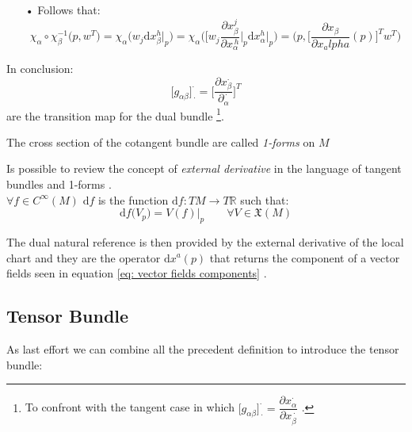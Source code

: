 \documentclass[a4paper,12pt]{scrartcl}    %
\begin{document}
\begin{observation}
\begin{itemize}
\item[•] Follows that:
	\begin{displaymath}
		\chi_\alpha \circ \chi_\beta^{-1} \big( p, w^T \big) =
		\chi_\alpha \big( w_j \textrm{d}x^h_\beta \big \vert_p \big) =
		\chi_\alpha \big( \big[ w_j \frac{\partial x^j_\beta}{\partial x^{\, h}_\alpha}\big \vert_p		\textrm{d}x^h_\alpha \big \vert_p \big) =
		\big( p, \big[ \frac{\partial x_\beta}{\partial x_alpha}(p) \big]^T w^T \big)	
	\end{displaymath}
\end{itemize}
In conclusion:
\begin{equation}
 \big[ g_{\alpha \beta} \big]^\cdot_{\, \cdot} = \big[\frac{\partial x_\beta^\cdot}{\partial_\alpha^{\, \cdot} } \big] ^T
\end{equation}
are the transition map for the dual bundle \footnote{To confront with the tangent case in which $\big[ g_{\alpha \beta} \big]^\cdot_{\, \cdot} = \dfrac{\partial x^\cdot_\alpha}{\partial x^{\, \cdot}_\beta}$ .}.
\end{observation}

\begin{notationfix}
The cross section of the cotangent bundle are called \emph{1-forms} on $M$
\end{notationfix}

\begin{observation}
Is possible to review the concept of \emph{external derivative} in the language of tangent bundles and 1-forms \cite{abate}.
\\
$\forall f \in C^\infty(M)$ $\textrm{d}f$
 is the function $ \textrm{d}f : TM \rightarrow T \mathbb{R} $ such that:
	\begin{equation}
		\textrm{d} f \big( V_p \big) = V(f) \big \vert_p \qquad \forall V \in \mathfrak{X}(M)
	\end{equation}
\end{observation}

\begin{observation}
The dual natural reference is then provided by the external derivative of the local chart and they are the operator $\textrm{d} x^a (p) $ that returns the component of a vector fields seen in equation \eqref{eq: vector fields components} .
\end{observation}

\subsection{Tensor Bundle}
As last effort we can combine all the precedent definition to introduce the tensor bundle:
\end{document}
